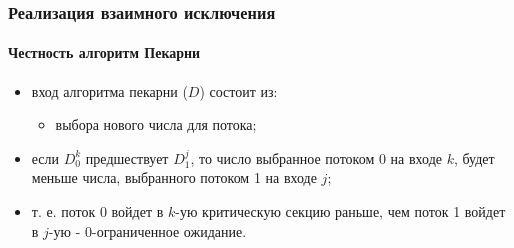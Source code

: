 \begin{frame}
\frametitle{Реализация взаимного исключения}
\framesubtitle{Честность алгоритм Пекарни}

\begin{itemize}
  \item вход алгоритма пекарни ($D$) состоит из:
        \begin{itemize}
          \item выбора нового числа для потока;
        \end{itemize}
  \item если $D_{0}^{k}$ предшествует $D_{1}^{j}$, то число выбранное потоком 0
        на входе $k$, будет меньше числа, выбранного потоком 1 на входе $j$;
  \item<2-> т. е. поток 0 войдет в $k$-ую критическую секцию раньше, чем поток 1
        войдет в $j$-ую - $0$-ограниченное ожидание.
\end{itemize}
\end{frame}
